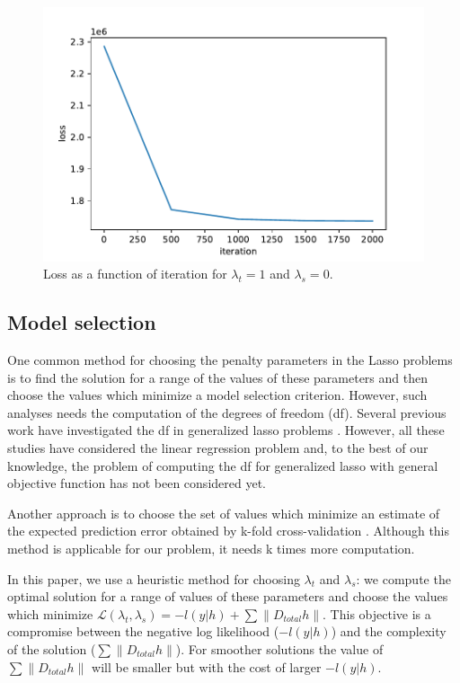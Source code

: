 \documentclass{article}
\begin{document}
\begin{figure}[ht]
	\vskip 0.2in
	\begin{center}
		\centerline{\includegraphics[width=1\columnwidth]{Figures/loss_vs_iter}}
		\caption{Loss as a function of iteration for $\lambda_t=1$ and $\lambda_s=0$.}
		\label{fig:loss_vs_iter}
	\end{center}
	\vskip -0.2in
\end{figure}

\subsection{Model selection}
One common method for choosing the penalty parameters in the Lasso problems is to find the solution for a range of the values of these parameters and then choose the values which minimize a model selection criterion. However, such analyses needs the computation of the degrees of freedom (df). Several previous work have investigated the df in generalized lasso problems \citep{tibshirani_degrees_2012,hu_dual_2015,zeng_geometry_2017}. However, all these studies have considered the linear regression problem and, to the best of our knowledge, the problem of computing the df for generalized lasso with general objective function has not been considered yet.

Another approach is to choose the set of values which minimize an estimate of the expected prediction error obtained by k-fold cross-validation \citep{tibshirani_regression_1996} . Although this method is applicable for our problem, it needs k times more computation.

In this paper, we use a heuristic method for choosing $\lambda_t$ and $\lambda_s$: we compute the optimal solution for a range of values of these parameters and choose the values which minimize $\mathscr{L}(\lambda_t,\lambda_s)=-l(y|h)+ \sum \lVert D_{total}h \lVert$. This objective is a compromise between the negative log likelihood ($-l(y|h)$) and the complexity of the solution ($\sum \lVert D_{total}h \lVert$). For smoother solutions the value of $\sum \lVert D_{total}h \lVert$ will be smaller but with the cost of larger $-l(y|h)$.
\end{document}
